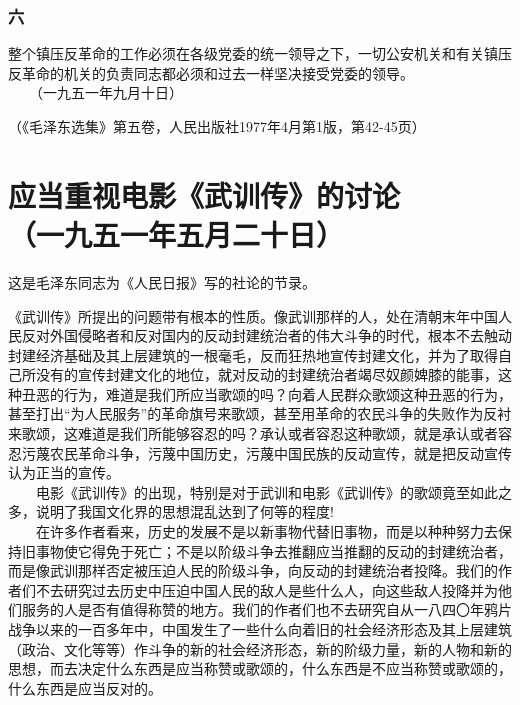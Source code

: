 \documentclass[cn,11pt,chinese]{elegantbook}
\def\myformat#1{\hfil\hfil #1}
\begin{document}
\subsubsection*{\myformat{六}}
整个镇压反革命的工作必须在各级党委的统一领导之下，一切公安机关和有关镇压反革命的机关的负责同志都必须和过去一样坚决接受党委的领导。\\
　　（一九五一年九月十日）\\
\begin{flushright}（《毛泽东选集》第五卷，人民出版社1977年4月第1版，第42-45页）\end{flushright}
\newpage\section*{\myformat{应当重视电影《武训传》的讨论}\\\myformat{（一九五一年五月二十日）}}
\begin{introduction}\item  这是毛泽东同志为《人民日报》写的社论的节录。\end{introduction}
《武训传》所提出的问题带有根本的性质。像武训那样的人，处在清朝末年中国人民反对外国侵略者和反对国内的反动封建统治者的伟大斗争的时代，根本不去触动封建经济基础及其上层建筑的一根毫毛，反而狂热地宣传封建文化，并为了取得自己所没有的宣传封建文化的地位，就对反动的封建统治者竭尽奴颜婢膝的能事，这种丑恶的行为，难道是我们所应当歌颂的吗？向着人民群众歌颂这种丑恶的行为，甚至打出“为人民服务”的革命旗号来歌颂，甚至用革命的农民斗争的失败作为反衬来歌颂，这难道是我们所能够容忍的吗？承认或者容忍这种歌颂，就是承认或者容忍污蔑农民革命斗争，污蔑中国历史，污蔑中国民族的反动宣传，就是把反动宣传认为正当的宣传。\\
　　电影《武训传》的出现，特别是对于武训和电影《武训传》的歌颂竟至如此之多，说明了我国文化界的思想混乱达到了何等的程度!\\
　　在许多作者看来，历史的发展不是以新事物代替旧事物，而是以种种努力去保持旧事物使它得免于死亡；不是以阶级斗争去推翻应当推翻的反动的封建统治者，而是像武训那样否定被压迫人民的阶级斗争，向反动的封建统治者投降。我们的作者们不去研究过去历史中压迫中国人民的敌人是些什么人，向这些敌人投降并为他们服务的人是否有值得称赞的地方。我们的作者们也不去研究自从一八四〇年鸦片战争以来的一百多年中，中国发生了一些什么向着旧的社会经济形态及其上层建筑（政治、文化等等）作斗争的新的社会经济形态，新的阶级力量，新的人物和新的思想，而去决定什么东西是应当称赞或歌颂的，什么东西是不应当称赞或歌颂的，什么东西是应当反对的。\\
\end{document}
